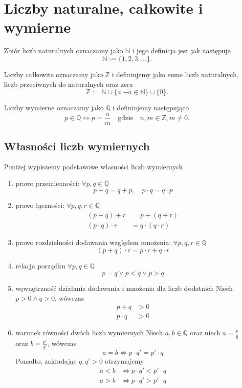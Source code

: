 \section{Liczby naturalne, całkowite i wymierne}
Zbiór liczb naturalnych oznaczamy jako $\mathbb{N}$ i jego definicja jest jak następuje
$$ \mathbb{N} := \{ 1, 2, 3, \ldots\}.$$

Liczby całkowite oznaczamy jako $\mathbb{Z}$ i definiujemy jako sume liczb naturalnych, liczb przeciwnych do naturalnych oraz zera
$$ \mathbb{Z} := \mathbb{N} \cup \{ a | -a \in \mathbb{N} \} \cup \{0\}. $$

Liczby wymierne oznaczamy jako $\mathbb{Q}$  i definiujemy następująco
$$ p \in \mathbb{Q} \iff p = \frac{n}{m} \quad \mbox{gdzie}\quad n,m \in \mathbb{Z}, m\neq 0.$$


\subsection{Własności liczb wymiernych}
Poniżej wypiszemy podstawowe własności liczb wymiernych
\begin{enumerate}
\item prawo przemienności: $\forall p,q\in\mathbb{Q}$
$$ p + q = q + p, \quad p \cdot q = q \cdot p$$
\item prawo łączności: $\forall p,q,r\in\mathbb{Q}$
\begin{align*}
(p+q) + r & = p + (q + r) \\
(p\cdot q) \cdot r & = q \cdot (q \cdot r)
\end{align*}
\item prawo rozdzielności dodawania względem mnożenia: $\forall p,q,r\in\mathbb{Q}$
$$ (p+q) \cdot r = p\cdot r + q\cdot r $$
\item relacja porządku $\forall p,q\in\mathbb{Q}$
$$ p=q \vee p<q \vee p>q $$
\item węwnętrzność działania dodawania i mnożenia dla liczb dodatnich
Niech $p>0 \wedge q>0$, wówczas
\begin{align*}
p+q & > 0 \\
p \cdot q & > 0
\end{align*}
\item warunek równości dwóch liczb wymiernych
Niech $a,b\in\mathbb{Q}$ oraz niech $a = \frac{p}{q}$ oraz $b = \frac{p'}{q'}$, wówczas
$$ a = b \iff p\cdot q' = p' \cdot q$$
Ponadto, zakładając $q, q' >0$ otrzymujemy
\begin{align*}
a<b & \iff p\cdot q' < p' \cdot q \\
a>b & \iff p\cdot q' > p' \cdot q 
\end{align*}
\end{enumerate}

